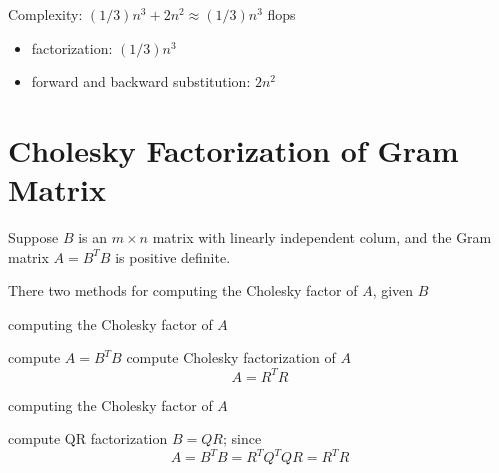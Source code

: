 Complexity: $ (1 / 3) n^{3}+2 n^{2} \approx(1 / 3) n^{3} $ flops

\begin{itemize}
    \item factorization: $ (1 / 3) n^{3} $
    \item forward and backward substitution: $ 2 n^{2} $
\end{itemize}


\section{Cholesky Factorization of Gram Matrix}
Suppose $ B $ is an $ m \times n $ matrix with linearly independent colum, and the Gram matrix $ A=B^{T} B $ is positive definite.

There two methods for computing the Cholesky factor of $ A $, given $ B $

\begin{algorithm}
    \caption{computing the Cholesky factor of $ A $}
    compute $ A=B^{T} B $\;
    compute Cholesky factorization of $ A $
    $$
    A=R^{T} R
    $$\;
    
\end{algorithm}

\begin{algorithm}
    \caption{computing the Cholesky factor of $ A $}

compute QR factorization $ B=Q R $; since
    $$
    A=B^{T} B=R^{T} Q^{T} Q R=R^{T} R
    $$\;
\end{algorithm}

